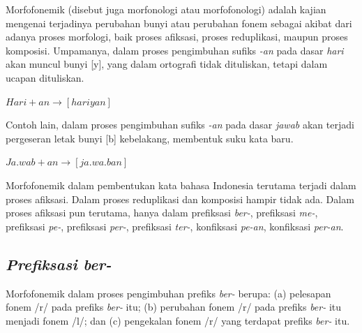 Morfofonemik (disebut juga morfonologi atau morfofonologi) adalah kajian mengenai terjadinya perubahan bunyi atau perubahan fonem sebagai akibat dari adanya proses morfologi, baik proses afiksasi, proses reduplikasi, maupun proses komposisi\cite{chaer:08:morfologi}. Umpamanya, dalam proses pengimbuhan sufiks \textit{-an} pada dasar \textit{hari} akan muncul bunyi [y], yang dalam ortografi tidak dituliskan, tetapi dalam ucapan dituliskan. 

\begin{center}
$Hari + an \rightarrow [hariyan]$
\end{center}

Contoh lain, dalam proses pengimbuhan sufiks \textit{-an} pada dasar \textit{jawab} akan terjadi pergeseran letak bunyi [b] kebelakang, membentuk suku kata baru.

\begin{center}
$Ja.wab + an \rightarrow [ja.wa.ban]$
\end{center}

Morfofonemik dalam pembentukan kata bahasa Indonesia terutama terjadi dalam proses afiksasi. Dalam proses reduplikasi dan komposisi hampir tidak ada. Dalam proses afiksasi pun terutama, hanya dalam prefiksasi \textit{ber-}, prefiksasi \textit{me-}, prefiksasi \textit{pe-}, prefiksasi \textit{per-}, prefiksasi \textit{ter-}, konfiksasi \textit{pe-an}, konfiksasi \textit{per-an}.


\subsection{\textit{Prefiksasi ber-}}
\label{sec:prefiksasiBer-}

Morfofonemik dalam proses pengimbuhan prefiks \textit{ber-} berupa: (a) pelesapan fonem /r/ pada prefiks \textit{ber-} itu; (b) perubahan fonem /r/ pada prefiks \textit{ber-} itu menjadi fonem /l/; dan (c) pengekalan fonem /r/ yang terdapat prefiks \textit{ber-} itu.

